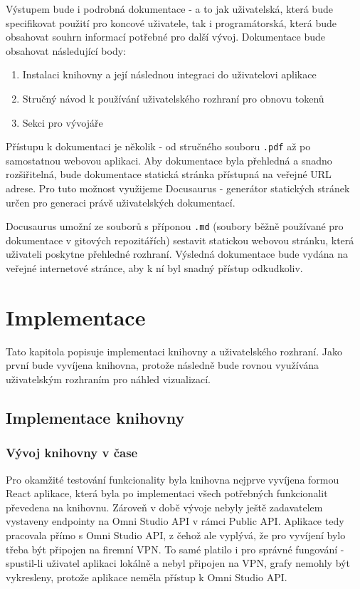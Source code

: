 \documentclass[czech, bc, kiv, he, iso690numb]{fasthesis}
\begin{document}
Výstupem bude i podrobná dokumentace - a to jak uživatelská, která bude specifikovat použití pro koncové uživatele, tak i programátorská, která bude obsahovat souhrn informací potřebné
pro další vývoj. Dokumentace bude obsahovat následující body:

\begin{enumerate}
	\item Instalaci knihovny a její následnou integraci do uživatelovi aplikace
	\item Stručný návod k používání uživatelského rozhraní pro obnovu tokenů
	\item Sekci pro vývojáře
\end{enumerate}

Přístupu k dokumentaci je několik - od stručného souboru \texttt{.pdf} až po samostatnou webovou aplikaci. Aby dokumentace byla přehledná a snadno rozšiřitelná, bude dokumentace statická stránka
přístupná na veřejné URL adrese. Pro tuto možnost využijeme Docusaurus - generátor statických stránek určen pro generaci právě uživatelských dokumentací. 

Docusaurus umožní ze souborů s příponou \texttt{.md} (soubory běžně používané pro dokumentace v gitových repozitářích) sestavit statickou webovou stránku, která uživateli poskytne přehledné 
rozhraní. Výsledná dokumentace bude vydána na veřejné internetové stránce, aby k ní byl snadný přístup odkudkoliv.


\chapter{Implementace}
Tato kapitola popisuje implementaci knihovny a uživatelského rozhraní. Jako první bude vyvíjena knihovna, protože následně bude rovnou využívána uživatelským rozhraním pro
náhled vizualizací.

\section{Implementace knihovny}

\subsection{Vývoj knihovny v čase}

Pro okamžité testování funkcionality byla knihovna nejprve vyvíjena formou React aplikace, která byla po implementaci všech potřebných funkcionalit převedena na knihovnu.
Zároveň v době vývoje nebyly ještě zadavatelem vystaveny endpointy na Omni Studio API v rámci Public API. Aplikace tedy pracovala přímo s Omni Studio API, z čehož ale vyplývá,
že pro vyvíjení bylo třeba být připojen na firemní VPN. To samé platilo i pro správné fungování - spustil-li uživatel aplikaci lokálně a nebyl připojen na VPN, grafy nemohly být vykresleny,
protože aplikace neměla přístup k Omni Studio API. 
\end{document}
